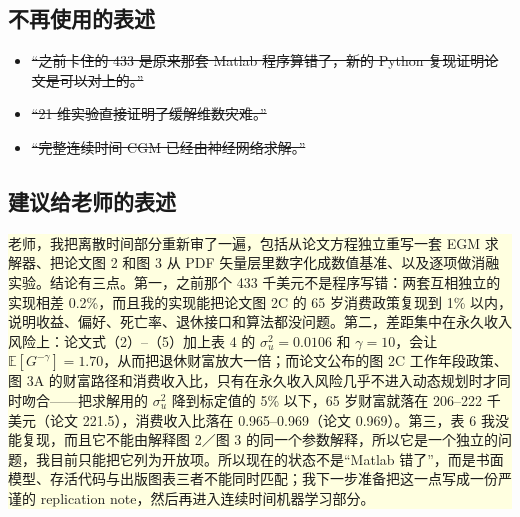 \documentclass[UTF8,a4paper,11pt,fontset=fandol]{ctexart}
\begin{document}
\subsection{不再使用的表述}
\begin{itemize}[leftmargin=1.6em,itemsep=2pt]
\item \sout{“之前卡住的 433 是原来那套 Matlab 程序算错了，新的 Python 复现证明论文是可以对上的。”}
\item \sout{“21 维实验直接证明了缓解维数灾难。”}
\item \sout{“完整连续时间 CGM 已经由神经网络求解。”}
\end{itemize}

\subsection{建议给老师的表述}
\begin{center}
\colorbox{lightyellow}{\parbox{0.92\textwidth}{
老师，我把离散时间部分重新审了一遍，包括从论文方程独立重写一套 EGM 求解器、把论文图 2 和图 3 从 PDF 矢量层里数字化成数值基准、以及逐项做消融实验。结论有三点。第一，之前那个 433 千美元不是程序写错：两套互相独立的实现相差 0.2\%，而且我的实现能把论文图 2C 的 65 岁消费政策复现到 1\% 以内，说明收益、偏好、死亡率、退休接口和算法都没问题。第二，差距集中在永久收入风险上：论文式（2）--（5）加上表 4 的 \(\sigma_u^2=0.0106\) 和 \(\gamma=10\)，会让 \(\mathbb{E}[G^{-\gamma}]=1.70\)，从而把退休财富放大一倍；而论文公布的图 2C 工作年段政策、图 3A 的财富路径和消费收入比，只有在永久收入风险几乎不进入动态规划时才同时吻合——把求解用的 \(\sigma_u^2\) 降到标定值的 5\% 以下，65 岁财富就落在 206--222 千美元（论文 221.5），消费收入比落在 0.965--0.969（论文 0.969）。第三，表 6 我没能复现，而且它不能由解释图 2／图 3 的同一个参数解释，所以它是一个独立的问题，我目前只能把它列为开放项。所以现在的状态不是“Matlab 错了”，而是书面模型、存活代码与出版图表三者不能同时匹配；我下一步准备把这一点写成一份严谨的 replication note，然后再进入连续时间机器学习部分。
}}
\end{center}
\end{document}
